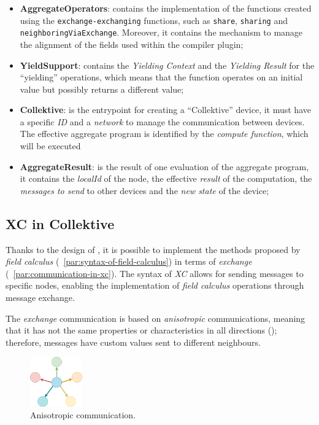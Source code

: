 \begin{itemize}
    \item \textbf{AggregateOperators}: contains the implementation of the functions created using the \texttt{exchange-exchanging} functions,
        such as \texttt{share}, \texttt{sharing} and \texttt{neighboringViaExchange}.
        Moreover, it contains the mechanism to manage the alignment of the fields used within the compiler plugin;
    \item \textbf{YieldSupport}: contains the \emph{Yielding Context} and the \emph{Yielding Result} for the ``yielding''
        operations, which means that the function operates on an initial value but possibly returns a different value;
    \item \textbf{Collektive}: is the entrypoint for creating a ``Collektive'' device, it must have a specific \emph{ID} and a
        \emph{network} to manage the communication between devices.
        The effective aggregate program is identified by the \emph{compute function}, which will be executed
    \item \textbf{AggregateResult}: is the result of one evaluation of the aggregate program, it contains the \emph{localId}
        of the node, the effective \emph{result} of the computation, the \emph{messages to send} to other devices and the \emph{new state} of the device;
\end{itemize}

\subsection{XC in Collektive}
\label{subsec:exchange-in-collektive}

Thanks to the design of \xc{}, it is possible to implement the methods proposed by \emph{field calculus}
(~\ref{par:syntax-of-field-calculus}) in terms of \emph{exchange} (~\ref{par:communication-in-xc}).
The syntax of \emph{XC} allows for sending messages to specific nodes, enabling the implementation of \emph{field calculus}
operations through message exchange.

The \emph{exchange} communication is based on \emph{anisotropic} communications, meaning that it has not the same properties
or characteristics in all directions (); therefore, messages have custom values sent to different neighbours.

\begin{figure}[h!]
    \centering
    \includegraphics[width=0.2\textwidth]{figures/anisotropic}
    \caption{Anisotropic communication.}
    \label{fig:anisotropic}
\end{figure}

